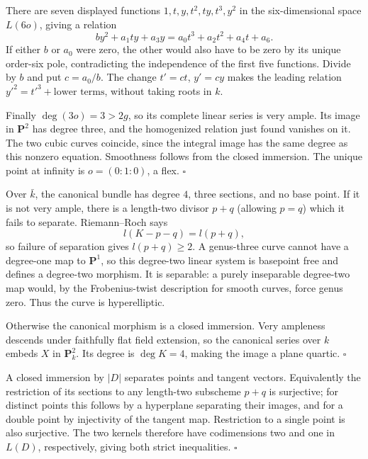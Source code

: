 \documentclass[11pt]{article}
\let\chapterexercise\exercise
\renewcommand{\exercise}[2]{\Needspace{8\baselineskip}\chapterexercise{#1}{#2}}
\begin{document}
There are seven displayed functions $1,t,y,t^2,ty,t^3,y^2$ in the six-dimensional space $L(6o)$, giving a relation
\[ b y^2+a_1ty+a_3y=a_0t^3+a_2t^2+a_4t+a_6. \]
If either $b$ or $a_0$ were zero, the other would also have to be zero by its unique order-six pole, contradicting the independence of the first five functions. Divide by $b$ and put $c=a_0/b$. The change $t'=ct$, $y'=cy$ makes the leading relation $y'^2=t'^3+\text{lower terms}$, without taking roots in $k$.

Finally $\deg(3o)=3>2g$, so its complete linear series is very ample. Its image in $\mathbf P^2$ has degree three, and the homogenized relation just found vanishes on it. The two cubic curves coincide, since the integral image has the same degree as this nonzero equation. Smoothness follows from the closed immersion. The unique point at infinity is $o=(0:1:0)$, a flex. \hfill$\square$

\pf
Over $\bar k$, the canonical bundle has degree $4$, three sections, and no base point. If it is not very ample, there is a length-two divisor $p+q$ (allowing $p=q$) which it fails to separate. Riemann--Roch says
\[ l(K-p-q)=l(p+q), \]
so failure of separation gives $l(p+q)\ge2$. A genus-three curve cannot have a degree-one map to $\mathbf P^1$, so this degree-two linear system is basepoint free and defines a degree-two morphism. It is separable: a purely inseparable degree-two map would, by the Frobenius-twist description for smooth curves, force genus zero. Thus the curve is hyperelliptic.

Otherwise the canonical morphism is a closed immersion. Very ampleness descends under faithfully flat field extension, so the canonical series over $k$ embeds $X$ in $\mathbf P^2_k$. Its degree is $\deg K=4$, making the image a plane quartic. \hfill$\square$

\pf
A closed immersion by $|D|$ separates points and tangent vectors. Equivalently the restriction of its sections to any length-two subscheme $p+q$ is surjective; for distinct points this follows by a hyperplane separating their images, and for a double point by injectivity of the tangent map. Restriction to a single point is also surjective. The two kernels therefore have codimensions two and one in $L(D)$, respectively, giving both strict inequalities. \hfill$\square$
\end{document}
